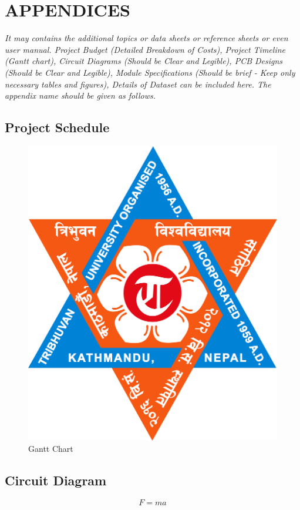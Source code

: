 \AppendixStyle{5.5em} %
\section{\MakeUppercase{Appendices}} \label{sec:appendices}
    \textit{It may contains the additional topics or data sheets or reference sheets or even user manual. Project Budget (Detailed Breakdown of Costs), Project Timeline (Gantt chart), Circuit Diagrams (Should be Clear and Legible), PCB Designs (Should be Clear and Legible), Module Specifications (Should be brief - Keep only necessary tables and figures), Details of Dataset can be included here. The appendix name should be given as follows.}
    
    \setcounter{subsection}{0}
    \subsection{Project Schedule}
    
    \begin{figure}[H]
        \centering
        \includegraphics[angle=90, origin=c, height=0.4\textheight]{TU_Logo.jpg}
        \caption{Gantt Chart}
        \label{fig:gantt}
    \end{figure}
    
    \pagebreak
    
    \subsection{Circuit Diagram}
    \begin{equation}
        F = ma 
    \end{equation}

